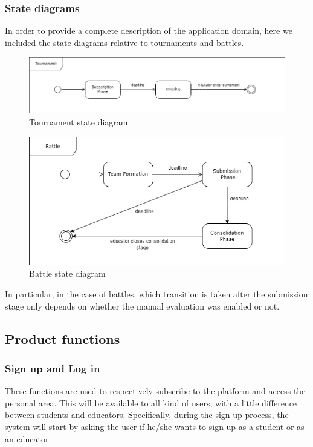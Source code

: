 \subsubsection{State diagrams}
In order to provide a complete description of the application domain, here we included the state diagrams relative to tournaments and battles.
\begin{figure}[H]
    \hspace{-20px}
    \includegraphics[scale=0.5]{Diagrams/tournament_state.jpg}
    \caption{Tournament state diagram}
    \label{tournament_state}
\end{figure}
\begin{figure}[H]
    \hspace{35px}
    \includegraphics[scale=0.5]{Diagrams/battle_state.jpg}
    \caption{Battle state diagram}
    \label{battle_state}
\end{figure}
In particular, in the case of battles, which transition is taken after the submission stage only depends on whether the manual evaluation was enabled or not.

\subsection{Product functions}
\subsubsection{Sign up and Log in}
These functions are used to respectively subscribe to the platform and access the personal area. This will be available to all kind of users, with a little difference between students and educators. Specifically, during the sign up process, the system will start by asking the user if he/she wants to sign up as a student or as an educator.

